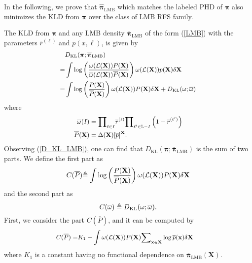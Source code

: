 \documentclass[journal]{IEEEtran}
\newcommand{\bX}{{\mathbf X}}
\newcommand{\bx}{{\mathbf x}}
\newcommand{\bpi}{{\boldsymbol\pi}}
\begin{document}
{In the following, we   prove that  $\hat \bpi_{\text{LMB}}$ which matches the labeled PHD of $\bpi$ also  minimizes the KLD from $\bpi$ over the class of LMB RFS family. 

The KLD from $\bpi$ and any LMB density  $\overline \bpi_{\text{LMB}}$ of the form (\ref{LMB}) with the parameters $\overline r^{(\ell)}$ and $p(x,\ell)$, is given by
\begin{equation}\label{D_KL_LMB}
{\small
\begin{split}
&D_{\text{KL}}(\bpi;\overline\bpi_{\text{LMB}})
\\=&\int \log\left(\frac{\omega(\mathcal{L}(\bX))P(\bX)}{\overline\omega(\mathcal{L}(\bX))\overline P(\bX)}\right)\omega(\mathcal{L}(\bX))p(\bX)\delta\bX\\
=&\int \log\left(\frac{P(\bX)}{\overline P(\bX)}\right)\omega(\mathcal{L}(\bX))P(\bX)\delta\bX+D_{\text{KL}}(\omega;\overline\omega)
\end{split}}
\end{equation}
where 
\begin{equation}
{\small
\begin{split}
\overline\omega(I)&={\prod}_{\ell\in I} \overline r^{(\ell)} {\prod}_{\ell'\in\mathbb{L}-I} \left(1-\overline r^{(\ell')}\right)\\
\overline P(\bX)&=\Delta(\bX)[{\overline p}]^{\bX}.
\end{split}}
\end{equation}
Observing (\ref{D_KL_LMB}), one can find that $D_{\text{KL}}(\bpi;\overline\bpi_{\text{LMB}})$ is the sum of two parts. We define the first part as
 \begin{equation}C(\overline P)
 {\small
\triangleq \int \log\left(\frac{P(\bX)}{\overline P(\bX)}\right)\omega(\mathcal{L}(\bX))P(\bX)\delta\bX}
\end{equation}
and the second part as
\begin{equation}
{\small
C(\overline\omega)\triangleq D_{\text{KL}}(\omega;\overline\omega).}
\end{equation}
First, we consider the part $C(\overline P)$, and it can be computed by
\begin{equation}\label{D_KL_p}
{\small
\begin{split}
C(\overline P)=&K_1-\int \omega(\mathcal{L}(\bX))P(\bX){\sum}_{\bx\in\bX}\log \overline p(\bx)\delta\bX
\end{split}}
\end{equation}
where $K_1$ is  a constant  having no functional dependence on $\overline\bpi_{\text{LMB}}(\bX)$.


}
\end{document}
